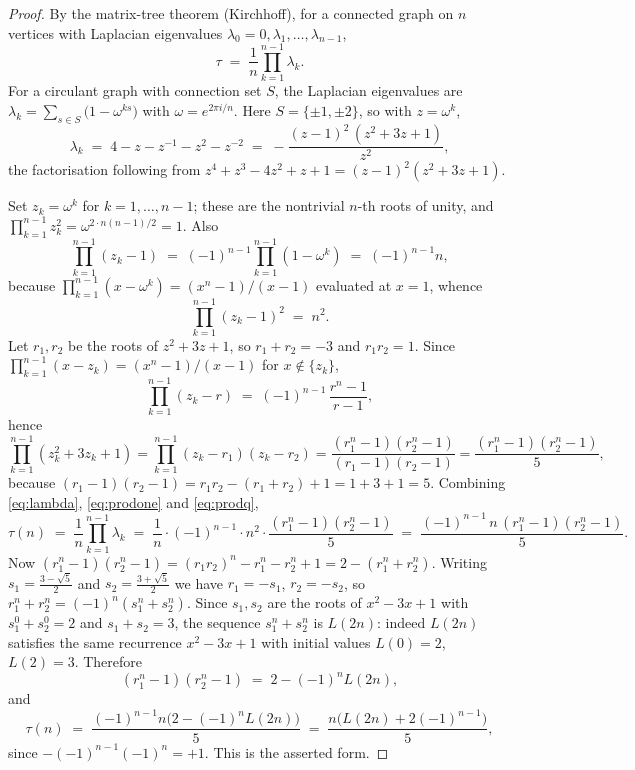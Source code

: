 \documentclass[11pt]{article}
\theoremstyle{definition}
\theoremstyle{remark}
\newcommand{\tauc}{\tau}
\begin{document}
\begin{proof}
By the matrix-tree theorem (Kirchhoff), for a connected graph on $n$ vertices
with Laplacian eigenvalues $\lambda_0 = 0, \lambda_1, \dots, \lambda_{n-1}$,
\[
\tauc \;=\; \frac1n \prod_{k=1}^{n-1} \lambda_k .
\]
For a circulant graph with connection set $S$, the Laplacian eigenvalues are
$\lambda_k = \sum_{s \in S} \bigl(1 - \omega^{ks}\bigr)$ with
$\omega = e^{2\pi i/n}$. Here $S = \{\pm 1, \pm 2\}$, so with $z = \omega^{k}$,
\begin{equation}
\label{eq:lambda}
\lambda_k \;=\; 4 - z - z^{-1} - z^{2} - z^{-2}
\;=\; -\frac{(z-1)^{2}\,(z^{2}+3z+1)}{z^{2}},
\end{equation}
the factorisation following from
$z^{4}+z^{3}-4z^{2}+z+1 = (z-1)^{2}(z^{2}+3z+1)$.

Set $z_k = \omega^{k}$ for $k = 1, \dots, n-1$; these are the nontrivial $n$-th
roots of unity, and $\prod_{k=1}^{n-1} z_k^{2} = \omega^{2 \cdot n(n-1)/2} = 1$.
Also
\[
\prod_{k=1}^{n-1}(z_k - 1) \;=\; (-1)^{n-1}\prod_{k=1}^{n-1}(1-\omega^{k}) \;=\; (-1)^{n-1} n ,
\]
because $\prod_{k=1}^{n-1}(x - \omega^{k}) = (x^{n}-1)/(x-1)$ evaluated at
$x = 1$, whence
\begin{equation}
\label{eq:prodone}
\prod_{k=1}^{n-1}(z_k-1)^{2} \;=\; n^{2}.
\end{equation}
Let $r_1, r_2$ be the roots of $z^{2}+3z+1$, so $r_1 + r_2 = -3$ and
$r_1 r_2 = 1$. Since
$\prod_{k=1}^{n-1}(x - z_k) = (x^{n}-1)/(x-1)$ for $x \notin \{z_k\}$,
\[
\prod_{k=1}^{n-1}(z_k - r) \;=\; (-1)^{n-1}\,\frac{r^{n}-1}{r-1},
\]
hence
\begin{equation}
\label{eq:prodq}
\prod_{k=1}^{n-1}(z_k^{2}+3z_k+1)
= \prod_{k=1}^{n-1}(z_k - r_1)(z_k - r_2)
= \frac{(r_1^{n}-1)(r_2^{n}-1)}{(r_1-1)(r_2-1)}
= \frac{(r_1^{n}-1)(r_2^{n}-1)}{5},
\end{equation}
because $(r_1-1)(r_2-1) = r_1r_2 - (r_1+r_2) + 1 = 1+3+1 = 5$. Combining
\eqref{eq:lambda}, \eqref{eq:prodone} and \eqref{eq:prodq},
\[
\tauc(n) \;=\; \frac1n \prod_{k=1}^{n-1}\lambda_k
\;=\; \frac1n \cdot (-1)^{n-1} \cdot n^{2} \cdot \frac{(r_1^{n}-1)(r_2^{n}-1)}{5}
\;=\; \frac{(-1)^{n-1}\,n\,(r_1^{n}-1)(r_2^{n}-1)}{5}.
\]
Now $(r_1^{n}-1)(r_2^{n}-1) = (r_1r_2)^{n} - r_1^{n} - r_2^{n} + 1
= 2 - (r_1^{n}+r_2^{n})$. Writing
$s_1 = \tfrac{3-\sqrt5}{2}$ and $s_2 = \tfrac{3+\sqrt5}{2}$ we have
$r_1 = -s_1$, $r_2 = -s_2$, so
$r_1^{n}+r_2^{n} = (-1)^{n}(s_1^{n}+s_2^{n})$. Since $s_1, s_2$ are the roots of
$x^{2}-3x+1$ with $s_1^{0}+s_2^{0} = 2$ and $s_1+s_2 = 3$, the sequence
$s_1^{n}+s_2^{n}$ is $L(2n)$: indeed $L(2n)$ satisfies the same recurrence
$x^{2}-3x+1$ with initial values $L(0)=2$, $L(2)=3$. Therefore
\[
(r_1^{n}-1)(r_2^{n}-1) \;=\; 2 - (-1)^{n} L(2n),
\]
and
\[
\tauc(n) \;=\; \frac{(-1)^{n-1} n \bigl(2 - (-1)^{n}L(2n)\bigr)}{5}
\;=\; \frac{n\bigl(L(2n) + 2(-1)^{n-1}\bigr)}{5},
\]
since $-(-1)^{n-1}(-1)^{n} = +1$. This is the asserted form.
\end{proof}
\end{document}
